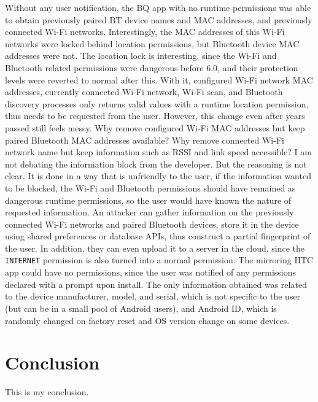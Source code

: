\documentclass[
  a4paper,  %
  twoside,  %
  bibliography=totoc,
  headsepline,
  cleardoublepage=empty,
  parskip=half,
  draft=false,
  open=any
]{scrbook}
\begin{document}
Without any user notification, the BQ app with no runtime permissions was able to obtain previously paired BT device names and MAC addresses, and previously connected Wi-Fi networks. Interestingly, the MAC addresses of this Wi-Fi networks were locked behind location permissions, but Bluetooth device MAC addresses were not. The location lock is interesting, since the Wi-Fi and Bluetooth related permissions were dangerous before 6.0, and their protection levels were reverted to normal after this. With it, configured Wi-Fi network MAC addresses, currently connected Wi-Fi network, Wi-Fi scan, and Bluetooth discovery processes only returns valid values with a runtime location permission, thus needs to be requested from the user. However, this change even after years passed still feels messy. Why remove configured Wi-Fi MAC addresses but keep paired Bluetooth MAC addresses available? Why remove connected Wi-Fi network name but keep information such as RSSI and link speed accessible? I am not debating the information block from the developer. But the reasoning is not clear. It is done in a way that is unfriendly to the user, if the information wanted to be blocked, the Wi-Fi and Bluetooth permissions should have remained as dangerous runtime permissions, so the user would have known the nature of requested information. An attacker can gather information on the previously connected Wi-Fi networks and paired Bluetooth devices, store it in the device using shared preferences or database APIs, thus construct a partial fingerprint of the user. In addition, they can even upload it to a server in the cloud, since the \texttt{INTERNET} permission is also turned into a normal permission. The mirroring HTC app could have no permissions, since the user was notified of any permissions declared with a prompt upon install. The only information obtained was related to the device manufacturer, model, and serial, which is not specific to the user (but can be in a small pool of Android users), and Android ID, which is randomly changed on factory reset and OS version change on some devices.

\chapter{Conclusion}
\label{cha:conclusion}


This is my conclusion. 

\printbibliography

\end{document}
